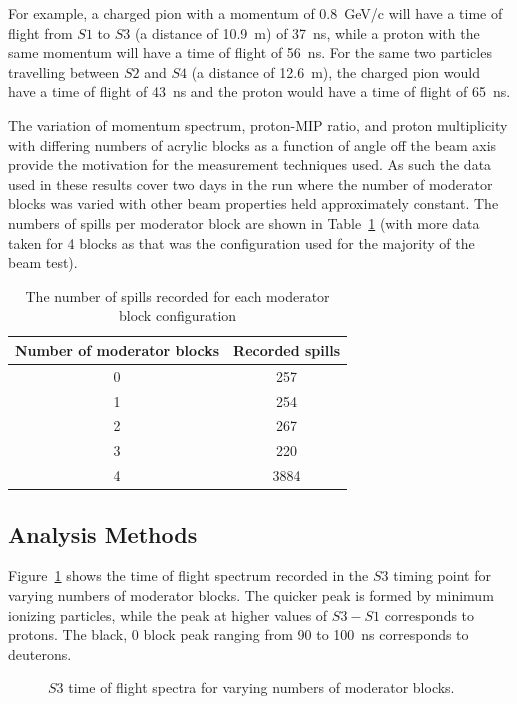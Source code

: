For example, a charged pion with a momentum of 0.8~GeV/c will have a time of flight from $\mathit{S1}$ to $\mathit{S3}$ (a distance of 10.9~m) of 37~ns, while a proton with the same momentum will have a time of flight of 56~ns.
For the same two particles travelling between $\mathit{S2}$ and $\mathit{S4}$ (a distance of 12.6~m), the charged pion would have a time of flight of 43~ns and the proton would have a time of flight of 65~ns.

The variation of momentum spectrum, proton-MIP ratio, and proton multiplicity with differing numbers of acrylic blocks as a function of angle off the beam axis provide the motivation for the measurement techniques used.
As such the data used in these results cover two days in the run where the number of moderator blocks was varied with other beam properties held approximately constant.
The numbers of spills per moderator block are shown in Table~\ref{tab:spills} (with more data taken for 4 blocks as that was the configuration used for the majority of the beam test).

\begin{table}
	\centering
	\begin{tabular}{|c|c|}
		\hline
		Number of moderator blocks & Recorded spills \\
		\hline
		0 & 257 \\
		1 & 254 \\
		2 & 267 \\
		3 & 220 \\
		4 & 3884 \\
		\hline
	\end{tabular}
	\caption{The number of spills recorded for each moderator block configuration}
	\label{tab:spills}
\end{table}

\subsection{Analysis Methods}

Figure~\ref{fig:s3tof} shows the time of flight spectrum recorded in the $\mathit{S3}$ timing point for varying numbers of moderator blocks.
The quicker peak is formed by minimum ionizing particles, while the peak at higher values of $\mathit{S3} - \mathit{S1}$ corresponds to protons.
The black, 0 block peak ranging from 90 to 100~ns corresponds to deuterons.
\begin{figure}[h]
	\begin{adjustbox}{max totalsize={.8\textwidth}{.5\textheight},center}
		
	\end{adjustbox}
	\caption{$\mathit{S3}$ time of flight spectra for varying numbers of moderator blocks.}
	\label{fig:s3tof}
\end{figure}

